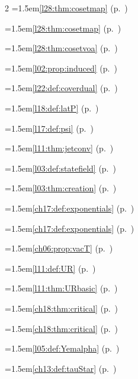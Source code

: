 \begin{multicols}{2}
\hangindent=1.5em\quad \ref{l28:thm:cosetmap} (p.~\pageref{l28:thm:cosetmap})\par
\hangindent=1.5em\quad \ref{l28:thm:cosetmap} (p.~\pageref{l28:thm:cosetmap})\par
\hangindent=1.5em\quad \ref{l28:thm:cosetvoa} (p.~\pageref{l28:thm:cosetvoa})\par
\hangindent=1.5em\quad \ref{l02:prop:induced} (p.~\pageref{l02:prop:induced})\par
\hangindent=1.5em\quad \ref{l22:def:coverdual} (p.~\pageref{l22:def:coverdual})\par
\hangindent=1.5em\quad \ref{l18:def:latP} (p.~\pageref{l18:def:latP})\par
\hangindent=1.5em\quad \ref{l17:def:psi} (p.~\pageref{l17:def:psi})\par
\hangindent=1.5em\quad \ref{l11:thm:jetconv} (p.~\pageref{l11:thm:jetconv})\par
\hangindent=1.5em\quad \ref{l03:def:statefield} (p.~\pageref{l03:def:statefield})\par
\hangindent=1.5em\quad \ref{l03:thm:creation} (p.~\pageref{l03:thm:creation})\par
\hangindent=1.5em\quad \ref{ch17:def:exponentials} (p.~\pageref{ch17:def:exponentials})\par
\hangindent=1.5em\quad \ref{ch17:def:exponentials} (p.~\pageref{ch17:def:exponentials})\par
\hangindent=1.5em\quad \ref{ch06:prop:vacT} (p.~\pageref{ch06:prop:vacT})\par
\hangindent=1.5em\quad \ref{l11:def:UR} (p.~\pageref{l11:def:UR})\par
\hangindent=1.5em\quad \ref{l11:thm:URbasic} (p.~\pageref{l11:thm:URbasic})\par
\hangindent=1.5em\quad \ref{ch18:thm:critical} (p.~\pageref{ch18:thm:critical})\par
\hangindent=1.5em\quad \ref{ch18:thm:critical} (p.~\pageref{ch18:thm:critical})\par
\hangindent=1.5em\quad \ref{l05:def:Yemalpha} (p.~\pageref{l05:def:Yemalpha})\par
\hangindent=1.5em\quad \ref{ch13:def:tauStar} (p.~\pageref{ch13:def:tauStar})\par

\end{multicols}
